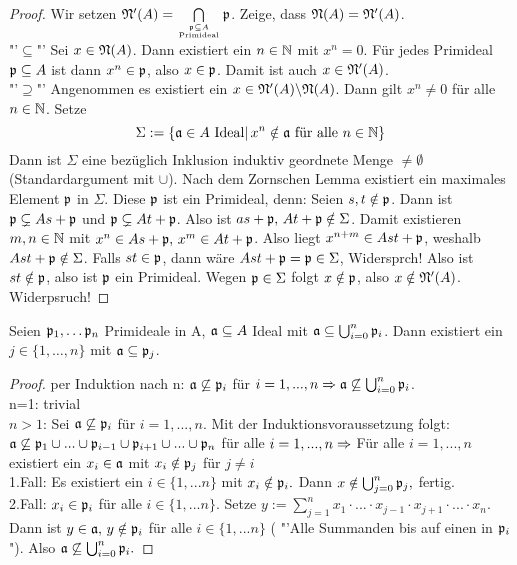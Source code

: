 \begin{proof}
	Wir setzen $\mathfrak{N}'(A)= \bigcap\limits_{\mathfrak{p} \subseteq A\atop \text{Primideal}} \mathfrak{p}$. Zeige, dass $\mathfrak{N}(A) = \mathfrak{N}'(A)$.\\
	"'$\subseteq$"' Sei $x\in \mathfrak{N}(A)$. Dann existiert ein $n\in \mathbb{N}$ mit $x^n=0$. Für jedes Primideal $\mathfrak{p}\subseteq A$ ist dann $x^n\in \mathfrak{p}$, also $x\in \mathfrak{p}$. Damit ist auch $x\in \mathfrak{N}'(A)$.\\
	"'$\supseteq$"' Angenommen es existiert ein $x\in \mathfrak{N}'(A) \backslash \mathfrak{N}(A)$. Dann gilt $x^n\neq 0$ für alle $n\in \mathbb{N}$. Setze
	$$\Sigma:= \{\mathfrak{a}\in A \text{ Ideal}|\, x^n\notin \mathfrak{a} \text{ für alle }n\in \mathbb{N}\}$$
	Dann ist $\Sigma$ eine bezüglich Inklusion induktiv geordnete Menge $\neq \emptyset$ (Standardargument mit $\cup$). Nach dem Zornschen Lemma existiert ein maximales Element $\mathfrak{p}$ in $\Sigma$. Diese $\mathfrak{p}$ ist ein Primideal, denn: Seien $s,t\notin \mathfrak{p}$. Dann ist $\mathfrak{p} \subsetneq As+ \mathfrak{p}$ und $\mathfrak{p}\subsetneq At+\mathfrak{p}$. Also ist $as+ \mathfrak{p}, \, At + \mathfrak{p} \notin\Sigma$. Damit existieren $m,n\in \mathbb{N}$ mit $x^n\in As+\mathfrak{p}, \, x^m \in At+ \mathfrak{p}$. Also liegt $x^{n+m} \in Ast+ \mathfrak{p}$, weshalb $Ast + \mathfrak{p} \notin\Sigma$. Falls $st \in \mathfrak{p}$, dann wäre $Ast + \mathfrak{p} = \mathfrak{p} \in \Sigma$, Widersprch! Also ist $st \notin \mathfrak{p}$, also ist $\mathfrak{p}$ ein Primideal. Wegen $\mathfrak{p} \in \Sigma$ folgt $x\notin \mathfrak{p}$, also $x\notin \mathfrak{N}'(A)$. Widerpsruch!
\end{proof}
\begin{bem} \label{11.6}
	Seien $ \mathfrak{p}_1, \dots \mathfrak{p}_n $ Primideale in A, $\mathfrak{a} \subseteq A $ Ideal mit $\mathfrak{a} \subseteq \bigcup_{i = 0}^{n} \mathfrak{p}_i$. Dann existiert ein $j \in \{1,\dots,n \} $ mit $ \mathfrak{a} \subseteq \mathfrak{p}_j$.
\end{bem}
\begin{proof}
	per Induktion nach n: $ \mathfrak{a} \not \subseteq \mathfrak{p}_i $ für $ i = 1,...,n  \Rightarrow \mathfrak{a} \not \subseteq \bigcup_{i = 0}^{n} \mathfrak{p}_i $. \\
	n=1: trivial\\
	$n>1$: Sei $\mathfrak{a} \not \subseteq \mathfrak{p}_i $ für $i = 1,...,n$. Mit der Induktionsvoraussetzung folgt: $\mathfrak{a} \not \subseteq \mathfrak{p}_1 \cup ... \cup \mathfrak{p}_{i-1} \cup \mathfrak{p}_{i+1} \cup ... \cup \mathfrak{p}_n $ für alle $i=1,...,n  \Rightarrow $ Für alle $ i = 1,...,n $ existiert ein $ x_i \in \mathfrak{a} $ mit $ x_i \notin \mathfrak{p}_j $ für $ j \neq i $ \\
	1.Fall: Es existiert ein $ i \in \{1,...n\} $ mit $ x_i \notin \mathfrak{p}_i.$ Dann $x \notin \bigcup_{j = 0}^{n} \mathfrak{p}_j, $ fertig. \\
	2.Fall: $x_i \in \mathfrak{p}_i $ für alle $i \in \{1,...n\} $. Setze $ y:= \sum_{j=1}^{n} x_1 \cdot ... \cdot x_{j-1} \cdot x_{j+1}  \cdot ... \cdot x_n$. Dann ist $y \in \mathfrak{a},\, y \notin \mathfrak{p}_i $ für  alle $i \in \{1,...n\} $ ( "'Alle Summanden bis auf einen in $\mathfrak{p}_i$"). Also $ \mathfrak{a} \not \subseteq \bigcup_{i = 0}^{n} \mathfrak{p}_i.$
\end{proof}
